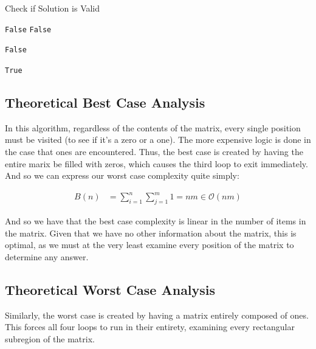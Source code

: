 \documentclass{article}
\begin{document}
\FloatBarrier
\begin{algorithm}
\caption{Check if Solution is Valid}
\begin{algorithmic}[1]
	 \Return \texttt{False} \EndIf
	 \Return \texttt{False} \EndIf

			 \Return \texttt{False} \EndIf
		\EndFor
	\EndFor

	\State \Return \texttt{True}
\EndFunction
\end{algorithmic}
\end{algorithm}
\FloatBarrier

\subsection {Theoretical Best Case Analysis}

In this algorithm, regardless of the contents of the matrix, every single position must be visited (to see if it's a zero or a one).
The more expensive logic is done in the case that ones are encountered.
Thus, the best case is created by having the entire marix be filled with zeros, which causes the third loop to exit immediately.
And so we can express our worst case complexity quite simply:

\begin{align}
B(n) &= \sum_{i=1}^n {\sum_{j=1}^m {1}} = nm \in \mathcal{O}(nm)
\end{align}

And so we have that the best case complexity is linear in the number of items in the matrix.
Given that we have no other information about the matrix, this is optimal, as we must at the very least examine every position of the matrix to determine any answer.

\subsection {Theoretical Worst Case Analysis}

Similarly, the worst case is created by having a matrix entirely composed of ones.
This forces all four loops to run in their entirety, examining every rectangular subregion of the matrix.
\end{document}
